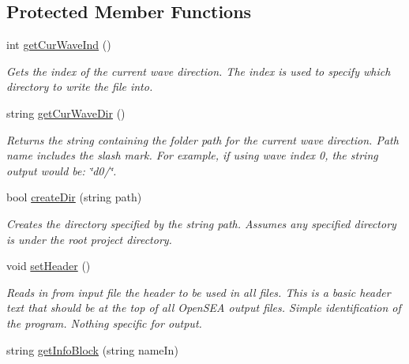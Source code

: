 \subsection*{Protected Member Functions}
\begin{DoxyCompactItemize}
\item 
int \hyperlink{class_file_writer_a9748d987475a225b49e14f48b8be0cd6}{get\-Cur\-Wave\-Ind} ()
\begin{DoxyCompactList}\small\item\em Gets the index of the current wave direction. The index is used to specify which directory to write the file into. \end{DoxyCompactList}\item 
string \hyperlink{class_file_writer_a82a3acb66bd5c0396836386258608a40}{get\-Cur\-Wave\-Dir} ()
\begin{DoxyCompactList}\small\item\em Returns the string containing the folder path for the current wave direction. Path name includes the slash mark. For example, if using wave index 0, the string output would be\-: \char`\"{}d0/\char`\"{}. \end{DoxyCompactList}\item 
bool \hyperlink{class_file_writer_ae6e5afc50484694d033628c954c62df3}{create\-Dir} (string path)
\begin{DoxyCompactList}\small\item\em Creates the directory specified by the string path. Assumes any specified directory is under the root project directory. \end{DoxyCompactList}\item 
\hypertarget{class_file_writer_aeea3ca877f0c5280b22ea7ff653db233}{void \hyperlink{class_file_writer_aeea3ca877f0c5280b22ea7ff653db233}{set\-Header} ()}\label{class_file_writer_aeea3ca877f0c5280b22ea7ff653db233}

\begin{DoxyCompactList}\small\item\em Reads in from input file the header to be used in all files. This is a basic header text that should be at the top of all Open\-S\-E\-A output files. Simple identification of the program. Nothing specific for output. \end{DoxyCompactList}\item 
string \hyperlink{class_file_writer_a419b9ba153151766c7a8c68717a11778}{get\-Info\-Block} (string name\-In)
\end{DoxyCompactItemize}



